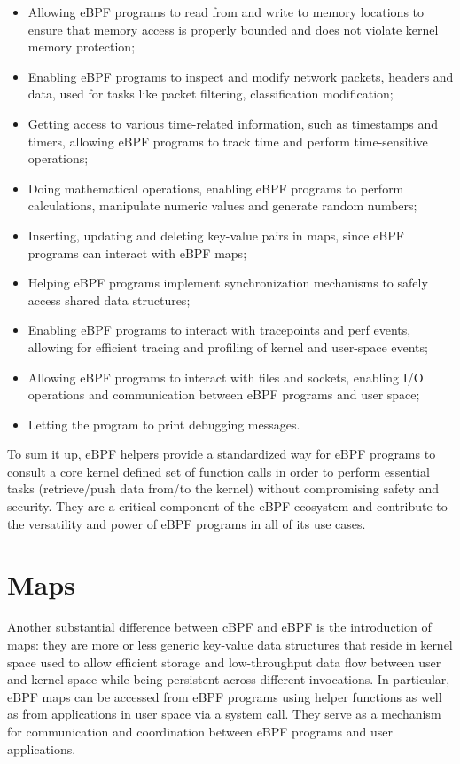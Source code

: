 \begin{itemize}
	\item Allowing eBPF programs to read from and write to memory locations to ensure
		that memory access is properly bounded and does not violate kernel memory protection;
	\item Enabling eBPF programs to inspect and modify network packets, headers	and 
		data, used for tasks like packet filtering, classification modification;
	\item Getting access to various time-related information, such as timestamps and
		timers, allowing eBPF programs to track time and perform time-sensitive operations;
	\item Doing mathematical operations, enabling eBPF programs to perform
		calculations, manipulate numeric values and generate random numbers;
	\item Inserting, updating and deleting key-value pairs in maps, since eBPF 
		programs can interact with eBPF maps;
	\item Helping eBPF programs implement synchronization mechanisms to	safely access
		shared data structures;
	\item Enabling eBPF programs to interact with tracepoints and perf events,
		allowing for efficient tracing and profiling of kernel and user-space events;
	\item Allowing eBPF programs to interact with files and sockets, enabling I/O
		operations and communication between eBPF programs and user space;
	\item Letting the program to print debugging messages.
\end{itemize}

To sum it up, eBPF helpers provide a standardized way for eBPF programs to consult a core kernel defined set of function calls in order to perform essential tasks (retrieve/push data from/to the kernel) without compromising safety and security. 
They are a critical component of the eBPF ecosystem and contribute to the versatility and power of eBPF programs in all of its use cases.

\section{Maps}

Another substantial difference between cBPF and eBPF is the introduction of maps: they are more or less generic key-value data structures that reside in kernel space used to 
allow efficient storage and low-throughput data flow between user and kernel space while being persistent across different invocations.
In particular, eBPF maps can be accessed from eBPF programs using helper functions as well as from applications in user space via a system call.
They serve as a mechanism for communication and coordination between eBPF programs and user applications.

